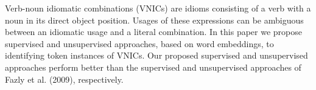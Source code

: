 Verb-noun idiomatic combinations (VNICs) are idioms consisting of a verb with a noun in its direct object position. Usages of these expressions can be ambiguous between an idiomatic usage and a literal combination. In this paper we propose supervised and unsupervised approaches, based on word embeddings, to identifying token instances of VNICs. Our proposed supervised and unsupervised approaches perform better than the supervised and unsupervised approaches of Fazly et al. (2009), respectively.
